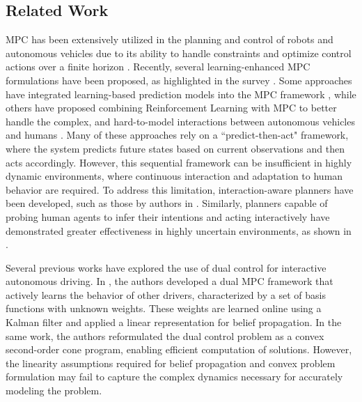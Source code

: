 \documentclass[letterpaper, 10 pt, conference]{IEEEconf}
\begin{document}
\subsection{Related Work}
MPC has been extensively utilized in the planning and control of robots and autonomous vehicles due to its ability to handle constraints and optimize control actions over a finite horizon \cite{yu2021model}. Recently, several learning-enhanced MPC formulations have been proposed, as highlighted in the survey \cite{aradi2020survey}. Some approaches have integrated learning-based prediction models into the MPC framework \cite{le2024multi}, while others have proposed combining Reinforcement Learning with MPC to better handle the complex, and hard-to-model interactions between autonomous vehicles and humans \cite{albarella2023hybrid,kimura2022decision}. Many of these approaches rely on a ``predict-then-act" framework, where the system predicts future states based on current observations and then acts accordingly. However,  this sequential framework can be insufficient in highly dynamic environments, where continuous interaction and adaptation to human behavior are required. To address this limitation, interaction-aware planners have been developed, such as those by authors in \cite{le2024multi,gupta2023interaction}. Similarly, planners capable of probing human agents to infer their intentions and acting interactively have demonstrated greater effectiveness in highly uncertain environments, as shown in \cite{wang2023active}. %

 
Several previous works have explored the use of dual control for interactive autonomous driving.
In \cite{nair2022stochastic}, the authors developed a dual MPC framework that actively learns the behavior of other drivers, characterized by a set of basis functions with unknown weights. 
These weights are learned online using a Kalman filter and applied a linear representation for belief propagation.
In the same work, the authors reformulated the dual control problem as a convex second-order cone program, enabling efficient computation of solutions.
However, the linearity assumptions required for belief propagation and convex problem formulation may fail to capture the complex dynamics necessary for accurately modeling the problem.
\end{document}
